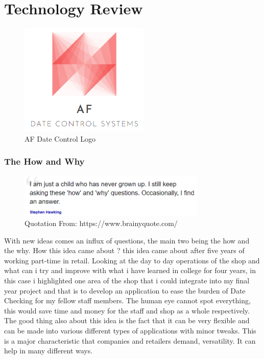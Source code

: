 \chapter{Technology Review}

\begin{figure}[h!]
	\caption{AF Date Control Logo}
	\label{image:AF-Date-Control}
	\centering
	\includegraphics[width=0.55\textwidth]{images/AF-Date-Control.png}
\end{figure}

\subsection{The How and Why}
\begin{figure}[h!]
	\caption{Quotation From: https://www.brainyquote.com/}
	\label{image:quote1}
	\centering
	\includegraphics[width=0.8\textwidth]{images/quote1.PNG}
\end{figure}

With new ideas comes an influx of questions, the main two being the how and the why. How this idea came about ? this idea came about after five years of working part-time in retail. Looking at the day to day operations of the shop and what can i try and improve with what i have learned in college for four years, in this case i highlighted one area of the shop that i could integrate into my final year project and that is to develop an application to ease the burden of Date Checking for my fellow staff members. The human eye cannot spot everything, this would save time and money for the staff and shop as a whole respectively. The good thing also about this idea is the fact that it can be very flexible and can be made into various different types of applications with minor tweaks. This is a major characteristic that companies and retailers demand, versatility. It can help in many different ways.
\newline

